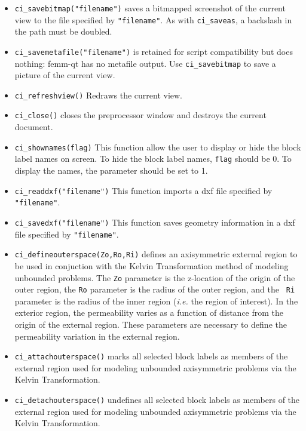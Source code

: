 \begin{itemize}
\item \texttt{ci\_savebitmap("filename")} saves a bitmapped screenshot of the current
view to the file specified by \texttt{"filename"}.  As with
\texttt{ci\_saveas}, a backslash in the path must be doubled.

\item \texttt{ci\_savemetafile("filename")} is retained for script
compatibility but does nothing: femm-qt has no metafile output. Use
\texttt{ci\_savebitmap} to save a picture of the current view.

\item \texttt{ci\_refreshview()} Redraws the current view.

\item \texttt{ci\_close()} closes the preprocessor window and
destroys the current document.

\item \texttt{ci\_shownames(flag)} This function allow the user to display or hide the
block label names on screen. To hide the block label names,
\texttt{flag} should be 0. To display the names, the parameter
should be set to 1.

\item{\tt ci\_readdxf("filename")} This function imports a dxf file specified by {\tt "filename"}.

\item{\tt ci\_savedxf("filename")} This function saves geometry information in a dxf file specified by {\tt "filename"}.

\item{\tt ci\_defineouterspace(Zo,Ro,Ri)} defines
an axisymmetric external region to be used in conjuction with the
Kelvin Transformation method of modeling unbounded problems.  The
{\tt Zo} parameter is the z-location of the origin of the outer region,
the {\tt Ro} parameter is the radius of the outer region, and the {\tt
Ri} parameter is the radius of the inner region ({\em i.e.} the region of
interest). In the exterior region, the permeability varies as a function of
distance from the origin of the external region.  These parameters
are necessary to define the permeability variation in the external
region.

\item{\tt ci\_attachouterspace()} marks all
selected block labels as members of the external region used for
modeling unbounded axisymmetric problems via the Kelvin
Transformation.

\item{\tt ci\_detachouterspace()} undefines all selected block labels
as members of the external region used for modeling unbounded axisymmetric
problems via the Kelvin Transformation.


\end{itemize}
